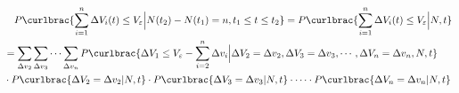 \documentclass[11pt]{article}
\begin{document}
\begin{align}
  \begin{aligned}
    &\quad P\curlbrac{\sum_{i=1}^{n}\Delta V_i(t)\le V_\varepsilon\Big| N(t_2)-N(t_1)=n,t_1\le t\le t_2}=P\curlbrac{\sum_{i=1}^{n}\Delta V_i(t)\le V_\varepsilon\Big| N,t}\\
    &=\sum_{\Delta v_2}\sum_{\Delta v_3}\cdots\sum_{\Delta v_n}P\curlbrac{\Delta V_1\le V_\varepsilon-\sum_{i=2}^{n}\Delta v_i
    \Big|\Delta V_2=\Delta v_2,\Delta V_3=\Delta v_3,\cdots,\Delta V_n=\Delta v_n,N,t}\\
    &\cdot P\curlbrac{\Delta V_2=\Delta v_2|N,t}\cdot P\curlbrac{\Delta V_3=\Delta v_3|N,t}\cdot \cdots \cdot P\curlbrac{\Delta V_n=\Delta v_n|N,t}
\end{aligned}
\label{eq:膜电位分布概率}
\end{align}\par
\newpage
\printbibliography[heading=bibliography,title=参考文献]
\end{document}
